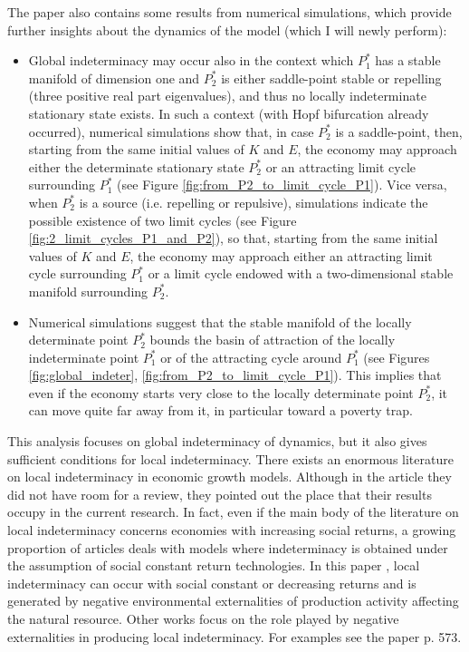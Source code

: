 The paper \cite{antoci_poverty_2011} also contains some results from numerical simulations, which provide further insights about the dynamics of the model (which I will newly perform):
\begin{itemize}
	\item Global indeterminacy may occur also in the context which $P_1^*$ has a stable manifold of dimension one and $P_2^*$ is either saddle-point stable or repelling (three positive real part eigenvalues), and thus no locally indeterminate stationary state exists. In such a context (with Hopf bifurcation already occurred), numerical simulations show that, in case $P_2^*$ is a saddle-point, then, starting from the same initial values of $K$ and $E$, the economy may approach either the determinate stationary state $P_2^*$ or an attracting limit cycle surrounding $P_1^*$ (see Figure \ref{fig:from_P2_to_limit_cycle_P1}). Vice versa, when $P_2^*$ is a source (i.e. repelling or repulsive), simulations indicate the possible existence of two limit cycles (see Figure \ref{fig:2_limit_cycles_P1_and_P2}), so that, starting from the same initial values of $K$ and $E$, the economy may approach either an attracting limit cycle surrounding $P_1^*$ or a limit cycle endowed with a two-dimensional stable manifold surrounding $P_2^*$.
	\item Numerical simulations suggest that the stable manifold of the locally determinate point $P_2^*$ bounds the basin of attraction of the locally indeterminate point $P_1^*$ or of the attracting cycle around $P_1^*$ (see Figures \ref{fig:global_indeter}, \ref{fig:from_P2_to_limit_cycle_P1}). This implies that even if the economy starts very close to the locally determinate point $P_2^*$, it can move quite far away from it, in particular toward a poverty trap.
\end{itemize}

This analysis focuses on global indeterminacy of dynamics, but it also gives sufficient conditions for local indeterminacy. There exists an enormous literature on local indeterminacy in economic growth models. Although in the article \cite{antoci_poverty_2011} they did not have room for a review, they pointed out the place that their results occupy in the current research. In fact, even if the main body of the literature on local indeterminacy concerns economies with increasing social returns, a growing proportion of articles deals with models where indeterminacy is obtained under the assumption of social constant return technologies. In this paper \cite{antoci_poverty_2011}, local indeterminacy can occur with social constant or decreasing returns and is generated by negative environmental externalities of production activity affecting the natural resource. Other works focus on the role played by negative externalities in producing local  indeterminacy. For examples see the paper \cite{antoci_poverty_2011} p. 573.


